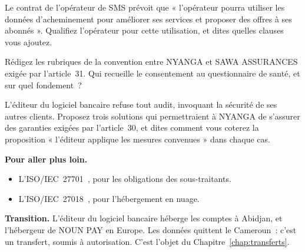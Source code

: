 \begin{boxexo}[title={\ding{45}\quad Exercice~13.2. Lire un contrat \niveaumoyen}]
Le contrat de l'opérateur de SMS prévoit que « l'opérateur pourra utiliser
les données d'acheminement pour améliorer ses services et proposer des
offres à ses abonnés ». Qualifiez l'opérateur pour cette utilisation, et
dites quelles clauses vous ajoutez.
\end{boxexo}

\begin{boxexo}[title={\ding{45}\quad Exercice~13.3. La convention publique \niveaumoyen}]
Rédigez les rubriques de la convention entre NYANGA et SAWA ASSURANCES
exigée par l'article~31. Qui recueille le consentement au questionnaire de
santé, et sur quel fondement~?
\end{boxexo}

\begin{boxexo}[title={\ding{45}\quad Exercice~13.4. Le refus d'audit \niveauexpert}]
L'éditeur du logiciel bancaire refuse tout audit, invoquant la sécurité de
ses autres clients. Proposez trois solutions qui permettraient à NYANGA de
s'assurer des garanties exigées par l'article~30, et dites comment vous
coterez la proposition « l'éditeur applique les mesures convenues » dans
chaque cas.
\end{boxexo}

\bigskip

\begin{boxinfo}
\textbf{Pour aller plus loin.}
\begin{itemize}
    \item L'ISO/IEC~27701~\cite{iso27701}, pour les obligations des
          sous-traitants.
    \item L'ISO/IEC~27018~\cite{iso27018}, pour l'hébergement en nuage.
\end{itemize}
\end{boxinfo}

\begin{boxinfo}
\textbf{Transition.} L'éditeur du logiciel bancaire héberge les comptes à
Abidjan, et l'hébergeur de NOUN PAY en Europe. Les données quittent le
Cameroun~: c'est un transfert, soumis à autorisation. C'est l'objet du
Chapitre~\ref{chap:transferts}.
\end{boxinfo}
